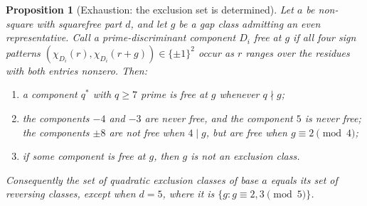 \documentclass[11pt,reqno]{amsart}
\theoremstyle{plain}
\newtheorem{proposition}[theorem]{Proposition}
\theoremstyle{definition}
\begin{document}
\begin{proposition}[Exhaustion: the exclusion set is determined]
\label{prop:exhaustion}
Let $a$ be non-square with squarefree part $d$, and let $g$ be a gap class
admitting an even representative. Call a prime-discriminant component $D_i$
\emph{free at $g$} if all four sign patterns
$(\chi_{D_i}(r), \chi_{D_i}(r+g)) \in \{\pm 1\}^2$ occur as $r$ ranges over the
residues with both entries nonzero. Then:
\begin{enumerate}
\item a component $q^*$ with $q \ge 7$ prime is free at $g$ whenever
      $q \nmid g$;
\item the components $-4$ and $-3$ are never free, and the component $5$ is
      never free; the components $\pm 8$ are not free when $4 \mid g$, but
      \emph{are} free when $g \equiv 2 \pmod 4$;
\item if some component is free at $g$, then $g$ is not an exclusion class.
\end{enumerate}
Consequently the set of quadratic exclusion classes of base $a$ equals its set
of reversing classes, except when $d = 5$, where it is
$\{g : g \equiv 2, 3 \pmod 5\}$.
\end{proposition}
\end{document}
